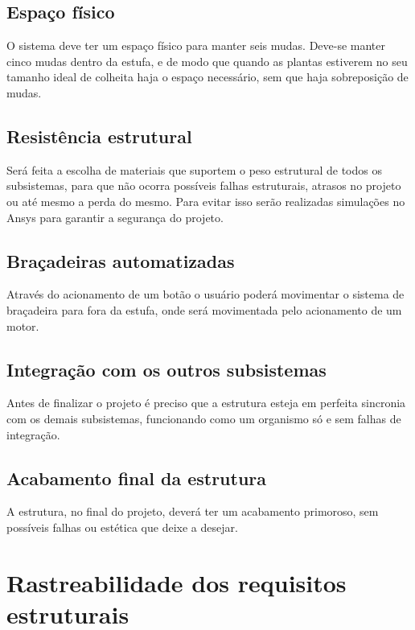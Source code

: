 \subsection{Espaço físico} 

O sistema deve ter um espaço físico para manter seis mudas. Deve-se manter cinco mudas dentro da estufa, e de modo que quando as plantas estiverem no seu tamanho ideal de colheita haja o espaço necessário, sem que haja sobreposição de mudas.

\subsection{Resistência estrutural} 

Será feita a escolha de materiais que suportem o peso estrutural de todos os subsistemas, para que não ocorra possíveis falhas estruturais, atrasos no projeto ou até mesmo a perda do mesmo. Para evitar isso serão realizadas simulações no Ansys para garantir a segurança do projeto.

\subsection{Braçadeiras automatizadas}

Através do acionamento de um botão o usuário poderá movimentar o sistema de braçadeira para fora da estufa, onde será movimentada pelo acionamento de um motor.

\subsection{Integração com os outros subsistemas}

Antes de finalizar o projeto é preciso que a estrutura esteja em perfeita sincronia com os demais subsistemas, funcionando como um organismo só e sem falhas de integração.

\subsection{Acabamento final da estrutura}

A estrutura, no final do projeto, deverá ter um acabamento primoroso, sem possíveis falhas ou estética que deixe a desejar.

\section{Rastreabilidade dos requisitos estruturais}

